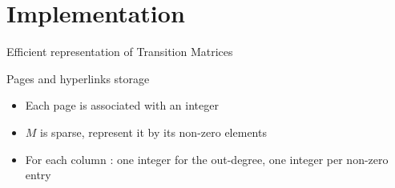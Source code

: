 \documentclass[10pt]{beamer}
\begin{document}
\section{Implementation}
\begin{frame}
  \tableofcontents[currentsection]
\end{frame}
\begin{frame}{Efficient representation of Transition Matrices}
  \begin{block}{Pages and hyperlinks storage}
  \begin{itemize}
    \item Each page is associated with an integer
    \item $M$ is sparse, represent it by its non-zero elements
    \item For each column : one integer for the out-degree, one integer per non-zero entry
  \end{itemize}
  \end{block}
\end{frame}
\end{document}
